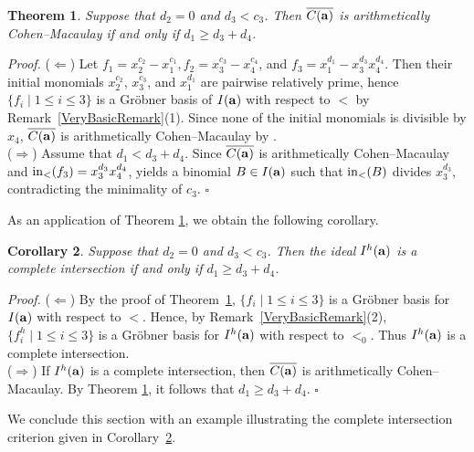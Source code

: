 \documentclass[10pt]{amsart}
\newtheorem{thm1}{Theorem}[section]
\newtheorem{cor1}[thm1]{Corollary}
\begin{document}
\begin{thm1} \label{ACM4} Suppose that $d_2=0$ and $d_{3}<c_{3}$. Then $\overline{C({\bf a})}$ is arithmetically Cohen--Macaulay if and only if $d_{1} \geq d_{3}+d_{4}$.
\end{thm1}
{\em \noindent Proof.} ($\Leftarrow$) Let $f_{1}=x_2^{c_2}-x_1^{c_1}, f_{2}=x_3^{c_3}-x_4^{c_4}$, and $f_{3}=x_1^{d_1}-x_3^{d_3}x_4^{d_4}$. Then their initial monomials $x_2^{c_2}$, $x_3^{c_3}$, and $x_1^{d_1}$ are pairwise relatively prime, hence $\{f_i \mid 1 \leq i \leq 3 \}$ is a Gr\"obner basis of $I({\bf a})$ with respect to $<$ by Remark~\ref{VeryBasicRemark}(1). Since none of the initial monomials is divisible by $x_4$, $\overline{C({\bf a})}$ is arithmetically Cohen--Macaulay by \cite[Theorem 2.2]{HerSta}.\\
($\Rightarrow$) Assume that $d_{1}<d_{3}+d_{4}$. Since $\overline{C({\bf a})}$ is arithmetically Cohen--Macaulay and ${\rm in}_{<}(f_{3})=x_3^{d_3}x_4^{d_4}$, \cite[Theorem 2.2]{HerSta} yields a binomial $B \in I({\bf a})$ such that ${\rm in}_{<}(B)$ divides $x_3^{d_{3}}$, contradicting the minimality of $c_{3}$. \hfill $\square$ \par\vspace{0.5\baselineskip}

As an application of Theorem \ref{ACM4}, we obtain the following corollary. 

\begin{cor1} \label{CorCase1CI} Suppose that $d_2=0$ and $d_{3}<c_{3}$. Then the ideal $I^{h}({\bf a})$ is a complete intersection if and only if $d_{1} \geq d_{3}+d_{4}$.
\end{cor1}

{\em \noindent Proof.} ($\Leftarrow$) By the proof of Theorem~\ref{ACM4}, $\{f_i \mid 1\le i\le 3\}$ is a Gr\"obner basis for $I({\bf a})$ with respect to $<$. Hence, by Remark~\ref{VeryBasicRemark}(2), $\{f_i^{h} \mid 1\le i\le 3\}$ is a Gr\"obner basis for $I^{h}({\bf a})$ with respect to $<_0$. Thus $I^{h}({\bf a})$ is a complete intersection.\\ ($\Rightarrow$) If $I^{h}({\bf a})$ is a complete intersection, then $\overline{C({\bf a})}$ is arithmetically Cohen--Macaulay. By Theorem \ref{ACM4}, it follows that $d_{1} \geq d_{3}+d_{4}$. \hfill $\square$ \par\vspace{0.5\baselineskip}

We conclude this section with an example illustrating the complete intersection criterion given in Corollary~\ref{CorCase1CI}.
\end{document}
